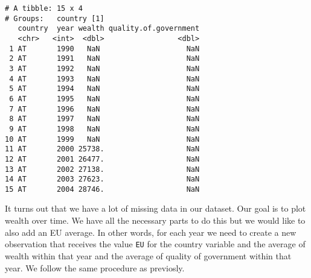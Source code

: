 \documentclass[]{article}
\newenvironment{Shaded}{\begin{snugshade}}{\end{snugshade}}
\newcommand{\DataTypeTok}[1]{\textcolor[rgb]{0.13,0.29,0.53}{#1}}
\newcommand{\DecValTok}[1]{\textcolor[rgb]{0.00,0.00,0.81}{#1}}
\newcommand{\KeywordTok}[1]{\textcolor[rgb]{0.13,0.29,0.53}{\textbf{#1}}}
\newcommand{\NormalTok}[1]{#1}
\newcommand{\OperatorTok}[1]{\textcolor[rgb]{0.81,0.36,0.00}{\textbf{#1}}}
\newcommand{\OtherTok}[1]{\textcolor[rgb]{0.56,0.35,0.01}{#1}}
\newcommand{\StringTok}[1]{\textcolor[rgb]{0.31,0.60,0.02}{#1}}
\begin{document}
\begin{Shaded}
\end{Shaded}

\begin{verbatim}
# A tibble: 15 x 4
# Groups:   country [1]
   country  year wealth quality.of.government
   <chr>   <int>  <dbl>                 <dbl>
 1 AT       1990   NaN                    NaN
 2 AT       1991   NaN                    NaN
 3 AT       1992   NaN                    NaN
 4 AT       1993   NaN                    NaN
 5 AT       1994   NaN                    NaN
 6 AT       1995   NaN                    NaN
 7 AT       1996   NaN                    NaN
 8 AT       1997   NaN                    NaN
 9 AT       1998   NaN                    NaN
10 AT       1999   NaN                    NaN
11 AT       2000 25738.                   NaN
12 AT       2001 26477.                   NaN
13 AT       2002 27138.                   NaN
14 AT       2003 27623.                   NaN
15 AT       2004 28746.                   NaN
\end{verbatim}

It turns out that we have a lot of missing data in our dataset. Our goal is to plot wealth over time. We have all the necessary parts to do this but we would like to also add an EU average. In other words, for each year we need to create a new observation that receives the value \texttt{EU} for the country variable and the average of wealth within that year and the average of quality of government within that year. We follow the same procedure as previosly.

\begin{Shaded}
\end{Shaded}
\end{document}
